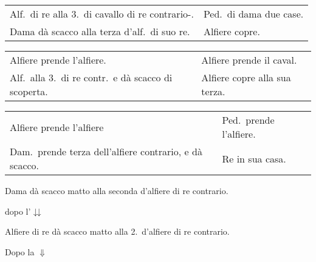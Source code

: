 \documentclass[11pt,a6paper]{article}
\newcommand{\markerA}{{\small$\Downarrow$}}
\newcommand{\markerB}{{\small$\downdownarrows$}}
\begin{document}
{\noindent\begin{tabular}{@{}p{3.84cm}p{3.84cm}}
Alf.\ di re alla 3.\ di cavallo di re contrario-.&Ped.\ di dama due case. \\
Dama dà scacco alla terza d'alf.\ di suo re.&Alfiere copre. \\
\end{tabular}

\noindent\begin{tabular}{@{}p{3.84cm}p{3.84cm}}
Alfiere prende l'alfiere. &Alfiere prende il caval.\\
Alf.\ alla 3.\ di re contr.\ e dà scacco di scoperta. &Alfiere copre alla sua terza. \\
\end{tabular}

\noindent\begin{tabular}{@{}p{3.84cm}p{3.84cm}}
Alfiere prende l'alfiere &Ped.\ prende l'alfiere. \\
Dam.\ prende terza dell'alfiere contrario, e dà scacco. &Re in sua casa.\\
\end{tabular}
}

Dama dà scacco matto alla seconda d'alfiere di re
contrario.

dopo l'{\markerB}


Alfiere di re dà scacco matto alla 2.\ d'alfiere di re
contrario.

Dopo la {\markerA}
\end{document}
